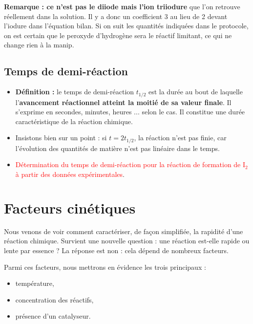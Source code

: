 \documentclass[11pt,a4paper]{report}
\begin{document}
\textbf{Remarque : ce n'est pas le diiode mais l'ion triiodure} que l'on retrouve réellement dans la solution. Il y a donc un coefficient 3 au lieu de 2 devant l'iodure dans l'équation bilan. Si on suit les quantités indiquées dans le protocole, on est certain que le peroxyde d'hydrogène sera le réactif limitant, ce qui ne change rien à la manip. 

\subsection{Temps de demi-réaction}

\begin{itemize}
	\item \textbf{Définition :} le temps de demi-réaction $t_{1/2}$ est la durée au bout de 			laquelle l'\textbf{avancement réactionnel atteint la moitié de sa valeur finale}. Il s'exprime 		en secondes, minutes, heures ... selon le cas. Il constitue une durée caractéristique de la 		réaction chimique.\\
	
	\item Insistons bien sur un point : si $t = 2t_{1/2}$, la réaction n'est pas finie, car 			l'évolution des quantités de matière n'est pas linéaire dans le temps.\\
	
	\item \textcolor{red}{Détermination du temps de demi-réaction pour la réaction de formation de 		$\text{I}_{\text{2}}$ à partir des données expérimentales}.
\end{itemize}

\newpage
\section{Facteurs cinétiques}

Nous venons de voir comment caractériser, de façon simplifiée, la rapidité d'une réaction chimique. Survient une nouvelle question : une réaction est-elle rapide ou lente par essence ? La réponse est non : cela dépend de nombreux facteurs.

Parmi ces facteurs, nous mettrons en évidence les trois principaux :
\begin{itemize}
	\item température,
	\item concentration des réactifs,
	\item présence d'un catalyseur.\\
\end{itemize}
\end{document}
